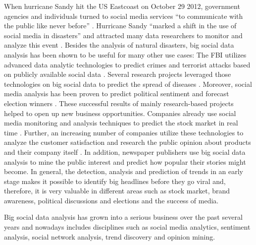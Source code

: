 When hurricane Sandy hit the US Eastcoast on October 29 2012, government agencies and individuals turned to social media services \enquote{to communicate with the public like never before} \cite{emergencymgmt2013sandy}. Hurricane Sandy \enquote{marked a shift in the use of social media in disasters} \cite[6]{security13sandy} and attracted many data researchers to monitor and analyze this event \cite{kumar2011tweettracker,carageamapping2014sandy}. Besides the analysis of natural disasters, big social data analysis has been shown to be useful for many other use cases: The FBI utilizes advanced data analytic technologies to predict crimes and terrorist attacks based on publicly available social data \cite{wang2012automatic}. Several research projects leveraged those technologies on big social data to predict the spread of diseases \cite{Google09detection,gft2014}. Moreover, social media analysis has been proven to predict political sentiment and forecast election winners \cite{bermingham2011using}. These successful results of mainly research-based projects helped to open up new business opportunities. Companies already use social media monitoring and analysis techniques to predict the stock market in real time \cite{bollen2011twitter,alcorn2013stockmarket}. Further, an increasing number of companies utilize these technologies to analyze the customer satisfaction and research the public opinion about products and their company itself \cite{journals/expert/CambriaSXH13}. In addition, newspaper publishers use big social data analysis to mine the public interest and predict how popular their stories might become. In general, the detection, analysis and prediction of trends in an early stage makes it possible to identify big headlines before they go viral and, therefore, it is very valuable in different areas such as stock market, brand awareness, political discussions and elections and the success of media. 

Big social data analysis has grown into a serious business over the past several years and nowadays includes disciplines such as social media analytics, sentiment analysis, social network analysis, trend discovery and opinion mining.



